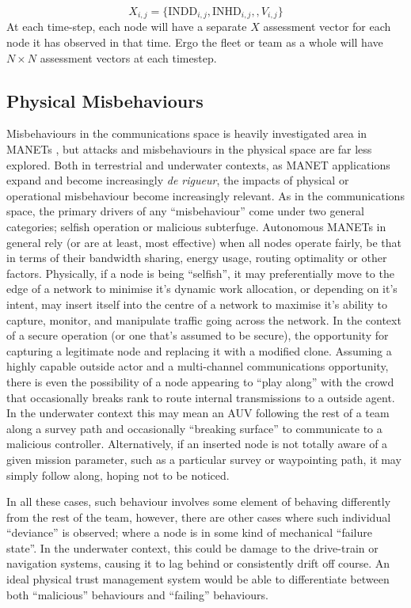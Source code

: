 \documentclass[conference]{IEEEtran}
\begin{document}
\begin{equation}
  X_{i,j}=\{\text{INDD}_{i,j}, \text{INHD}_{i,j},, V_{i,j}\}
  \label{eq:phys_vector}
\end{equation}
At each time-step, each node will have a separate $X$ assessment vector for each node it has observed in that time. 
Ergo the fleet or team as a whole will have $N\times N$ assessment vectors at each timestep.

\subsection{Physical Misbehaviours}
Misbehaviours in the communications space is heavily investigated area in MANETs \cite{Konate2011}\cite{Wang2009}\cite{Chen2014a}\cite{Mitchell2014}, but attacks and misbehaviours in the physical space are far less explored. 
Both in terrestrial and underwater contexts, as MANET applications expand and become increasingly \emph{de rigueur}, the impacts of physical or operational misbehaviour become increasingly relevant. 
As in the communications space, the primary drivers of any ``misbehaviour'' come under two general categories; selfish operation or malicious subterfuge.
Autonomous MANETs in general rely (or are at least, most effective) when all nodes operate fairly, be that in terms of their bandwidth sharing, energy usage, routing optimality or other factors. 
Physically, if a node is being ``selfish'', it may preferentially move to the edge of a network to minimise it's dynamic work allocation, or depending on it's intent, may insert itself into the centre of a network to maximise it's ability to capture, monitor, and manipulate traffic going across the network. 
In the context of a secure operation (or one that's assumed to be secure), the opportunity for capturing a legitimate node and replacing it with a modified clone.
Assuming a highly capable outside actor and a multi-channel communications opportunity, there is even the possibility of a node appearing to ``play along'' with the crowd that occasionally breaks rank to route internal transmissions to a outside agent.
In the underwater context this may mean an AUV following the rest of a team along a survey path and occasionally ``breaking surface'' to communicate to a malicious controller.
Alternatively, if an inserted node is not totally aware of a given mission parameter, such as a particular survey or waypointing path, it may simply follow along, hoping not to be noticed.

In all these cases, such behaviour involves some element of behaving differently from the rest of the team, however, there are other cases where such individual ``deviance'' is observed; where a node is in some kind of mechanical ``failure state''.
In the underwater context, this could be damage to the drive-train or navigation systems, causing it to lag behind or consistently drift off course. 
An ideal physical trust management system would be able to differentiate between both ``malicious'' behaviours and ``failing'' behaviours.
\end{document}
